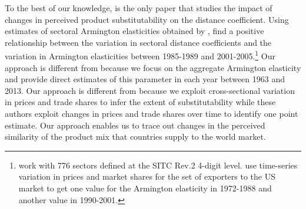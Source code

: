 \documentclass[12pt,twoside,a4paper,notitlepage]{article}
\begin{document}
To the best of our knowledge, \cite{Berthelon2008} is the only paper that studies the impact of changes in perceived product substitutability on the distance coefficient.
Using estimates of sectoral Armington elasticities obtained by \cite{Broda2006}, \cite{Berthelon2008} find a positive relationship between the variation in sectoral distance coefficients and the variation in Armington elasticities between 1985-1989 and 2001-2005.\footnote{\cite{Berthelon2008} work with 776 sectors defined at the SITC Rev.2 4-digit level.
\cite{Broda2006} use time-series variation in prices and market shares for the set of exporters to the US market to get one value for the Armington elasticity in 1972-1988 and another value in 1990-2001.}
Our approach is different from \cite{Berthelon2008} because we focus on the aggregate Armington elasticity and provide direct estimates of this parameter in each year between 1963 and 2013.
Our approach is different from \cite{Broda2006} because we exploit cross-sectional variation in prices and trade shares to infer the extent of substitutability while these authors exploit changes in prices and trade shares over time to identify one point estimate.
Our approach enables us to trace out changes in the perceived similarity of the product mix that countries supply to the world market.
\end{document}
